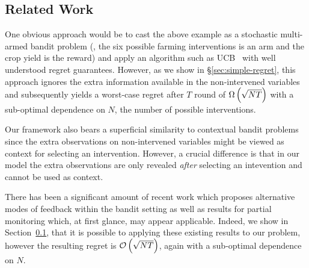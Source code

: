

\subsection{Related Work}

One obvious approach would be to cast the above example as a stochastic multi-armed bandit problem (\eg, the six possible farming interventions is an arm and the crop yield is the reward) and apply an algorithm such as UCB~\cite{Auer1995} with well understood regret guarantees.
However, as we show in \S\ref{sec:simple-regret}, this approach ignores the extra information available in the non-intervened variables and subsequently yields a worst-case regret after $T$ round of $\Omega\left( \sqrt{NT} \right)$ with a sub-optimal dependence on $N$, the number of possible interventions.


Our framework also bears a superficial similarity to contextual bandit problems \cite{Langford2008,Agarwal2014} since the extra observations on non-intervened variables might be viewed as context for selecting an intervention. However, a crucial difference is that in our model the extra observations are only revealed \emph{after} selecting an intevention and cannot be used as context.

There has been a significant amount of recent work which proposes alternative modes of feedback within the bandit setting \cite{TODO} as well as results for partial monitoring which, at first glance, may appear applicable. Indeed, we show in Section~\ref{}, that it is possible to applying these existing results to our problem, however the resulting regret is $\mathcal{O}\left( \sqrt{NT} \right)$, again with a sub-optimal dependence on $N$.





